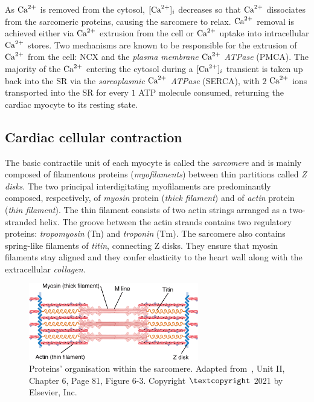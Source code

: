 \vspace{0.2cm}
As $\textrm{Ca}^{2+}$ is removed from the cytosol, $[\textrm{Ca}^{2+}]_{i}$ decreases so that $\textrm{Ca}^{2+}$ dissociates from the sarcomeric proteins, causing the sarcomere to relax. $\textrm{Ca}^{2+}$ removal is achieved either via $\textrm{Ca}^{2+}$ extrusion from the cell or $\textrm{Ca}^{2+}$ uptake into intracellular $\textrm{Ca}^{2+}$ stores. Two mechanisms are known to be responsible for the extrusion of $\textrm{Ca}^{2+}$ from the cell: NCX and the \textit{plasma membrane} $\textrm{Ca}^{2+}$ \textit{ATPase} (\acs{PMCA}). The majority of the $\textrm{Ca}^{2+}$ entering the cytosol during a $[\textrm{Ca}^{2+}]_{i}$ transient is taken up back into the SR via the \textit{sarcoplasmic} $\textrm{Ca}^{2+}$ \textit{ATPase} (\acs{SERCA}), with $2$ $\textrm{Ca}^{2+}$ ions transported into the SR for every $1$ ATP molecule consumed, returning the cardiac myocyte to its resting state.


%
%
%
\subsection{Cardiac cellular contraction}\label{sec:ch1cardiac_cellular_contraction}
The basic contractile unit of each myocyte is called the \textit{sarcomere} and is mainly composed of filamentous proteins (\textit{myofilaments}) between thin partitions called \textit{Z disks}. The two principal interdigitating myofilaments are predominantly composed, respectively, of \textit{myosin} protein (\textit{thick filament}) and of \textit{actin} protein (\textit{thin filament}). The thin filament consists of two actin strings arranged as a two-stranded helix. The groove between the actin strands contains two regulatory proteins: \textit{tropomyosin} (\acs{Tn}) and \textit{troponin} (\acs{Tm}). The sarcomere also contains spring-like filaments of \textit{titin}, connecting Z disks. They ensure that myosin filaments stay aligned and they confer elasticity to the heart wall along with the extracellular \textit{collagen}.

\begin{figure}[ht!]
    \myfloatalign
    \includegraphics[width=0.66\textwidth]{figures/chapter01/fig5.png}
    \caption{Proteins' organisation within the sarcomere. Adapted from~\cite{Guyton:2021}, Unit II, Chapter 6, Page 81, Figure 6-3. Copyright $\textcopyright$ 2021 by Elsevier, Inc.}
    \label{fig:my_label3}
\end{figure}

